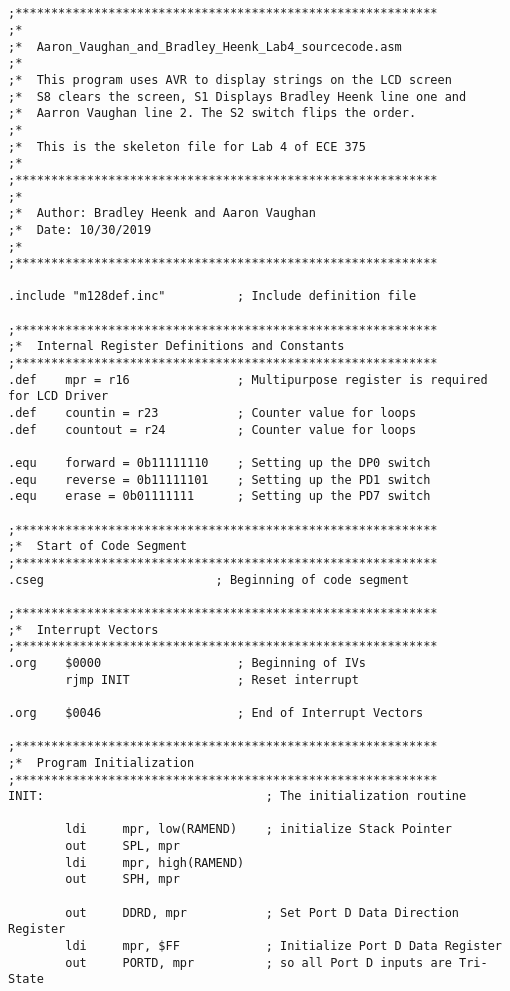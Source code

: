 \documentclass[12pt, letterpaper]{article}
\begin{document}
\begin{verbatim}
    

;***********************************************************
;*
;*	Aaron_Vaughan_and_Bradley_Heenk_Lab4_sourcecode.asm
;*
;*	This program uses AVR to display strings on the LCD screen
;*	S8 clears the screen, S1 Displays Bradley Heenk line one and
;*	Aarron Vaughan line 2. The S2 switch flips the order.
;*
;*	This is the skeleton file for Lab 4 of ECE 375
;*
;***********************************************************
;*
;*	Author: Bradley Heenk and Aaron Vaughan
;*	Date: 10/30/2019
;*
;***********************************************************

.include "m128def.inc"			; Include definition file

;***********************************************************
;*	Internal Register Definitions and Constants
;***********************************************************
.def	mpr = r16               ; Multipurpose register is required for LCD Driver
.def	countin = r23           ; Counter value for loops
.def	countout = r24          ; Counter value for loops

.equ	forward = 0b11111110    ; Setting up the DP0 switch
.equ	reverse	= 0b11111101    ; Setting up the PD1 switch
.equ	erase = 0b01111111      ; Setting up the PD7 switch

;***********************************************************
;*	Start of Code Segment
;***********************************************************
.cseg                        ; Beginning of code segment

;***********************************************************
;*	Interrupt Vectors
;***********************************************************
.org	$0000                   ; Beginning of IVs
 		rjmp INIT               ; Reset interrupt

.org	$0046                   ; End of Interrupt Vectors

;***********************************************************
;*	Program Initialization
;***********************************************************
INIT:                               ; The initialization routine

		ldi		mpr, low(RAMEND)    ; initialize Stack Pointer
		out		SPL, mpr			
		ldi		mpr, high(RAMEND)
		out		SPH, mpr

		out		DDRD, mpr           ; Set Port D Data Direction Register
		ldi		mpr, $FF            ; Initialize Port D Data Register
		out		PORTD, mpr          ; so all Port D inputs are Tri-State


\end{verbatim}
\end{document}
